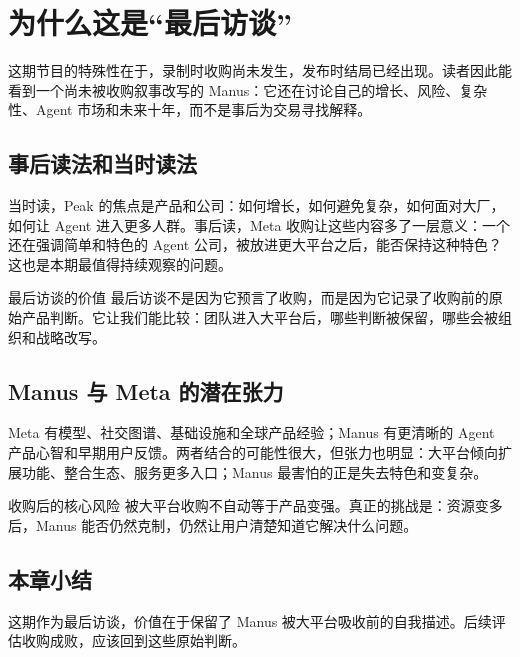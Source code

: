 \section{为什么这是“最后访谈”}

这期节目的特殊性在于，录制时收购尚未发生，发布时结局已经出现。读者因此能看到一个尚未被收购叙事改写的 Manus：它还在讨论自己的增长、风险、复杂性、Agent 市场和未来十年，而不是事后为交易寻找解释。

\subsection{事后读法和当时读法}

当时读，Peak 的焦点是产品和公司：如何增长，如何避免复杂，如何面对大厂，如何让 Agent 进入更多人群。事后读，Meta 收购让这些内容多了一层意义：一个还在强调简单和特色的 Agent 公司，被放进更大平台之后，能否保持这种特色？这也是本期最值得持续观察的问题。

\begin{knowledgebox}{最后访谈的价值}
最后访谈不是因为它预言了收购，而是因为它记录了收购前的原始产品判断。它让我们能比较：团队进入大平台后，哪些判断被保留，哪些会被组织和战略改写。
\end{knowledgebox}

\subsection{Manus 与 Meta 的潜在张力}

Meta 有模型、社交图谱、基础设施和全球产品经验；Manus 有更清晰的 Agent 产品心智和早期用户反馈。两者结合的可能性很大，但张力也明显：大平台倾向扩展功能、整合生态、服务更多入口；Manus 最害怕的正是失去特色和变复杂。

\begin{warningbox}{收购后的核心风险}
被大平台收购不自动等于产品变强。真正的挑战是：资源变多后，Manus 能否仍然克制，仍然让用户清楚知道它解决什么问题。
\end{warningbox}

\subsection{本章小结}

这期作为最后访谈，价值在于保留了 Manus 被大平台吸收前的自我描述。后续评估收购成败，应该回到这些原始判断。

